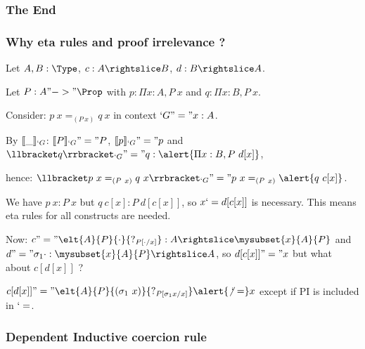 \begin{frame}
  \frametitle{The End}
\end{frame}

\begin{frame}
  \frametitle{Why eta rules and proof irrelevance ?}
  
  Let $A,B : \Type$, $c : A \suba B$, $d : B \suba A$. 
  \pause
  
  Let $P : A "->" \Prop$ with $p : \Pi x : A, P~x$ and $q : \Pi x : B,
  P~x$.
  
  \pause
  Consider: $p~x =_{(P~x)} q~x$ in context $`G "=" x : A$. 
  
  By $\llbracket \_ \rrbracket_{`G}$: $\llbracket P \rrbracket_{`G} "=" P$, $\llbracket p \rrbracket_{`G} "=" p$ and
  $\ip{q}{`G} "=" q : \alert{\Pi x : B, P~d[x]}$, \pause 
  
  hence: $\ip{p~x =_{(P~x)} q~x}{`G} "=" p~x =_{(P~x)} \alert{q~c[x]}$.

  We have $p~x : P~x$ but $q~c[x] : P~d[c[x]]$, so $x `= d[c[x]]$ is
  necessary.
  This means eta rules for all constructs are needed.
  \pause
  
  Now: $c "=" \elt{A}{P}{\cdot}{?_{P[\cdot/x]}} : A \suba
  \mysubset{x}{A}{P}$ and $d "=" \eltpit{\cdot} : \mysubset{x}{A}{P}
  \suba A$, so $d[c[x]] "=" x$ but what about $c[d[x]]$ ? 
  \pause

  $c[d[x]] "=" \elt{A}{P}{(\eltpit~x)}{?_{P[\eltpit x/x]}} \alert{\not`=}
  x$ except if PI is included in $`=$.
  
\end{frame}



\begin{frame}
  \frametitle{Dependent Inductive coercion rule}
  \indfig
\end{frame}

